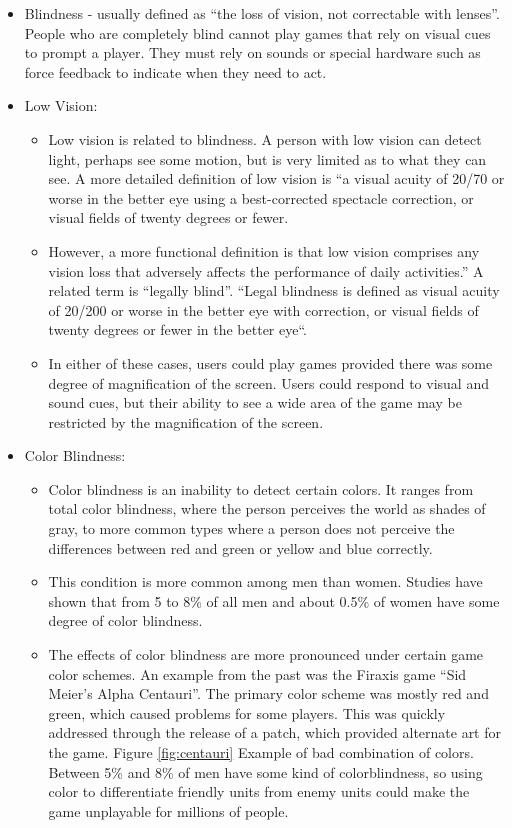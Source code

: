 \documentclass[a4paper,twoside,12pt]{book}
\begin{document}
\begin{itemize}
\item Blindness - usually defined as “the loss of vision, not correctable with lenses”. People who are completely blind cannot play games that rely on visual cues to prompt a player. They must rely on sounds or special hardware such as force feedback to indicate when they need to act.
\item Low Vision:
\begin{itemize}
\item Low vision is related to blindness. A person with low vision can detect light, perhaps see some motion, but is very limited as to what they can see.
A more detailed definition of low vision is “a visual acuity of 20/70 or worse in the better eye using a best-corrected spectacle correction, or visual fields of twenty degrees or fewer.
\item However, a more functional definition is that low vision comprises any vision loss that adversely affects the performance of daily activities.” A related term is “legally blind”. “Legal blindness is defined as visual acuity of 20/200 or worse in the better eye with correction, or visual fields of twenty degrees or fewer in the better eye“.
\item In either of these cases, users could play games provided there was some degree of magnification of the screen. Users could respond to visual and sound cues, but their ability to see a wide area of the game may be restricted by the magnification of the screen.
\end{itemize}
\item Color Blindness:
\begin{itemize}
\item Color blindness is an inability to detect certain colors. It ranges from total color blindness, where the person perceives the world as shades of gray, to more common types where a person does not perceive the differences between red and green or yellow and blue correctly.
\item This condition is more common among men than women. Studies have shown that from 5 to 8\% of all men and about 0.5\% of women have some degree of color blindness.
\item The effects of color blindness are more pronounced under certain game color schemes. An example from the past was the Firaxis game “Sid Meier’s Alpha Centauri”. The primary color scheme was mostly red and green, which caused problems for some players. This was quickly addressed through the release of a patch, which provided alternate art for the game. Figure \ref{fig:centauri} Example of bad combination of colors. Between 5\% and 8\% of men have some kind of colorblindness, so using color to differentiate friendly units from enemy units could make the game unplayable for millions of people\cite{bib:colorblind}.\
	\end{itemize}
\end{itemize}
\end{document}
